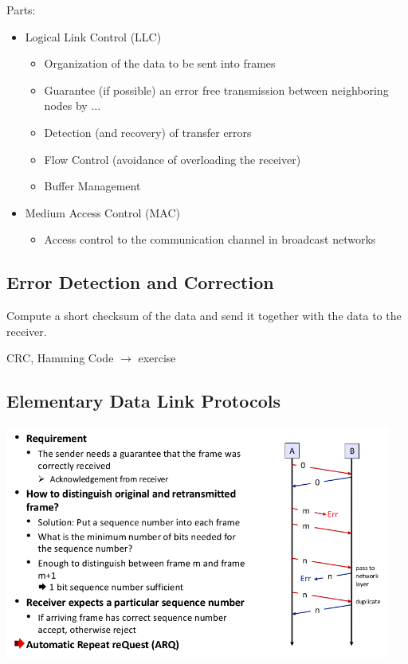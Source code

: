 \documentclass[11pt,ngerman]{article}
\begin{document}
\noindent Parts:
\begin{itemize}[noitemsep,nolistsep]
\item Logical	Link	Control	(LLC)
\begin{itemize}[noitemsep,nolistsep]
\item  Organization	of	the	data	to	be	sent	into	frames
\item Guarantee	(if	possible)	an	error	free	transmission	between	neighboring nodes	by	...
\item Detection	(and	recovery)	of	transfer	errors
\item Flow	Control	(avoidance	of	overloading	the	receiver)
\item Buffer	Management
\end{itemize}
\item Medium	Access	Control	(MAC)
\begin{itemize}[noitemsep,nolistsep]
\item Access	control	to	the	communication	channel	in	broadcast	networks
\end{itemize}
\end{itemize}

\subsection{Error	Detection	and	Correction}
Compute	a	short	checksum	of	the	data	and	send	it	together	with	
the	data	to	the	receiver.	

CRC, Hamming Code $\rightarrow$ exercise

\subsection{Elementary	Data	Link	Protocols}

\includegraphics[width=5in]{images/Selection_016.png}
\end{document}
